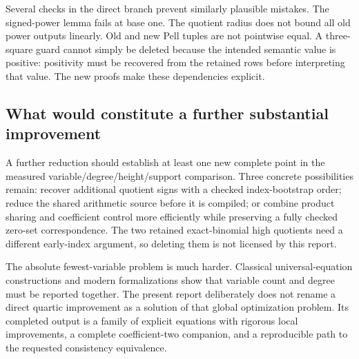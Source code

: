 Several checks in the direct branch prevent similarly plausible mistakes. The signed-power lemma fails at base one. The quotient radius does not bound all old power outputs linearly. Old and new Pell tuples are not pointwise equal. A three-square guard cannot simply be deleted because the intended semantic value is positive: positivity must be recovered from the retained rows before interpreting that value. The new proofs make these dependencies explicit.

\subsection{What would constitute a further substantial improvement}

A further reduction should establish at least one new complete point in the measured variable/degree/height/support comparison. Three concrete possibilities remain: recover additional quotient signs with a checked index-bootstrap order; reduce the shared arithmetic source before it is compiled; or combine product sharing and coefficient control more efficiently while preserving a fully checked zero-set correspondence. The two retained exact-binomial high quotients need a different early-index argument, so deleting them is not licensed by this report.

The absolute fewest-variable problem is much harder. Classical universal-equation constructions and modern formalizations show that variable count and degree must be reported together.\cite{jones,universalpairs} The present report deliberately does not rename a direct quartic improvement as a solution of that global optimization problem. Its completed output is a family of explicit equations with rigorous local improvements, a complete coefficient-two companion, and a reproducible path to the requested consistency equivalence.
